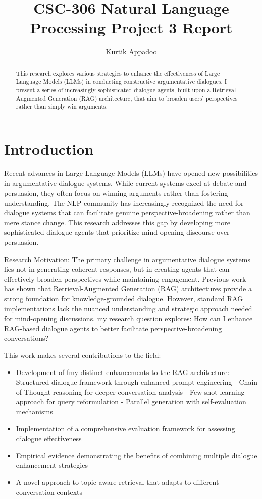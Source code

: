\documentclass[11pt]{article}
\title{CSC-306 Natural Language Processing Project 3 Report}
\author{Kurtik Appadoo}
\begin{document}
\maketitle
\begin{abstract}
This research explores various strategies to enhance the effectiveness of Large Language Models (LLMs) in conducting constructive argumentative dialogues. I present a series of increasingly sophisticated dialogue agents, built upon a Retrieval-Augmented Generation (RAG) architecture, that aim to broaden users' perspectives rather than simply win arguments. 

\end{abstract}

\section{Introduction}
Recent advances in Large Language Models (LLMs) have opened new possibilities in argumentative dialogue systems. While current systems excel at debate and persuasion, they often focus on winning arguments rather than fostering understanding. The NLP community has increasingly recognized the need for dialogue systems that can facilitate genuine perspective-broadening rather than mere stance change. This research addresses this gap by developing more sophisticated dialogue agents that prioritize mind-opening discourse over persuasion.

Research Motivation:
The primary challenge in argumentative dialogue systems lies not in generating coherent responses, but in creating agents that can effectively broaden perspectives while maintaining engagement. Previous work has shown that Retrieval-Augmented Generation (RAG) architectures provide a strong foundation for knowledge-grounded dialogue. However, standard RAG implementations lack the nuanced understanding and strategic approach needed for mind-opening discussions. my  research question explores: How can I enhance RAG-based dialogue agents to better facilitate perspective-broadening conversations?

This work makes several contributions to the field:
\begin{itemize}
\item Development of fmy distinct enhancements to the RAG architecture:
   - Structured dialogue framework through enhanced prompt engineering
   - Chain of Thought reasoning for deeper conversation analysis
   - Few-shot learning approach for query reformulation
   - Parallel generation with self-evaluation mechanisms
\item Implementation of a comprehensive evaluation framework for assessing dialogue effectiveness
\item Empirical evidence demonstrating the benefits of combining multiple dialogue enhancement strategies
\item A novel approach to topic-aware retrieval that adapts to different conversation contexts
\end{itemize}
\end{document}
